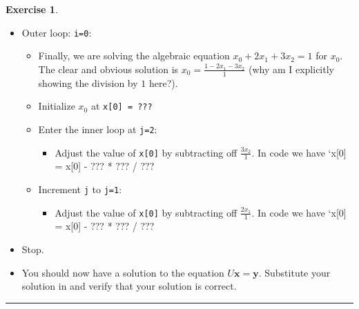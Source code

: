 \documentclass[
]{book}
\providecommand{\tightlist}{%
  \setlength{\itemsep}{0pt}\setlength{\parskip}{0pt}}
\theoremstyle{definition}
\theoremstyle{definition}
\theoremstyle{definition}
\newtheorem{exercise}{Exercise}[chapter]
\theoremstyle{remark}
\begin{document}
\begin{exercise}
\begin{itemize}
\begin{itemize}
    \begin{itemize}
    \tightlist
    \item
      To complete the algebra we need to take our initialized value of \texttt{x{[}1{]}} and subtract off \(\frac{-6x_2}{-3}\). In code this is \texttt{x{[}1{]}\ =\ x{[}1{]}\ -\ U{[}1,2{]}\ *\ x{[}2{]}\ /\ U{[}1,1{]}}
    \end{itemize}
  \item
    There is nothing else to do so the inner loop should end.
  \end{itemize}
\item
  Outer loop: \texttt{i=0}:

  \begin{itemize}
  \tightlist
  \item
    Finally, we are solving the algebraic equation \(x_0 + 2x_1 + 3 x_2 = 1\) for \(x_0\). The clear and obvious solution is \(x_0 = \frac{1 - 2x_1 - 3x_2}{1}\) (why am I explicitly showing the division by \(1\) here?).\\
  \item
    Initialize \(x_0\) at \texttt{x{[}0{]}\ =\ ???}
  \item
    Enter the inner loop at \texttt{j=2}:

    \begin{itemize}
    \tightlist
    \item
      Adjust the value of \texttt{x{[}0{]}} by subtracting off \(\frac{3x_2}{1}\). In code we have `x{[}0{]} = x{[}0{]} - ??? * ??? / ???
    \end{itemize}
  \item
    Increment \texttt{j} to \texttt{j=1}:

    \begin{itemize}
    \tightlist
    \item
      Adjust the value of \texttt{x{[}0{]}} by subtracting off \(\frac{2x_1}{1}\). In code we have `x{[}0{]} = x{[}0{]} - ??? * ??? / ???
    \end{itemize}
  \end{itemize}
\item
  Stop.
\item
  You should now have a solution to the equation \(U \boldsymbol{x} = \boldsymbol{y}\). Substitute your solution in and verify that your solution is correct.
\end{itemize}
\end{exercise}

\begin{center}\rule{0.5\linewidth}{0.5pt}\end{center}
\end{document}

